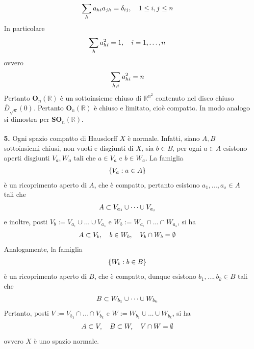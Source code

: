 \documentclass[oneside, 11pt]{amsbook}
\newcommand{\0}{{(0)}}
\newcommand{\3}{{(3)}}
\theoremstyle{colonplain}
\theoremstyle{colondefinition}
\theoremstyle{colonremark}
\numberwithin{equation}{chapter}
\begin{document}
\begin{align}
    \sum_h a_{hi}a_{jh} = \delta_{ij}, \quad 1 \leq i, j \leq n \notag
\end{align}
In particolare
\begin{align}
    \sum_h a^2_{hi} = 1, \quad i = 1, \dots, n \notag
\end{align}
ovvero
\begin{align}
    \sum_{h, i} a^2_{hi} = n \notag
\end{align}
Pertanto $\mathbf{O}_n(\mathbb{R})$ è un sottoinsieme chiuso di $\mathbb{R}^{n^2}$ contenuto nel disco chiuso $\overline{D}_{\sqrt{n}}(0)$. Pertanto $\mathbf{O}_n(\mathbb{R})$ è chiuso e limitato, cioè compatto. In modo analogo si dimostra per $\mathbf{SO}_n(\mathbb{R})$. \\ \\
\textbf{5.} Ogni spazio compatto di Hausdorff $X$ è normale. Infatti, siano $A, B$ sottoinsiemi chiusi, non vuoti e disgiunti di $X$, sia $b \in B$, per ogni $a \in A$ esistono aperti disgiunti $V_a, W_a$ tali che $a \in V_a$ e $b \in W_a$. La famiglia
\begin{align}
    \{ V_a : a \in A \} \notag
\end{align}
è un ricoprimento aperto di $A$, che è compatto, pertanto esistono $a_1, \dots, a_s \in A$ tali che
\begin{align}
    A \subset V_{a_1} \cup \dots \cup V_{a_s} \notag
\end{align}
e inoltre, posti $V_b := V_{a_1} \cup \dots \cup V_{a_s}$ e $W_b := W_{a_1} \cap \dots \cap W_{a_s}$, si ha
\begin{align}
    A \subset V_b, \quad b \in W_b, \quad V_b \cap W_b = \emptyset \notag
\end{align}
Analogamente, la famiglia
\begin{align}
    \{ W_b : b \in B \} \notag
\end{align}
è un ricoprimento aperto di $B$, che è compatto, dunque esistono $b_1, \dots, b_k \in B$ tali che
\begin{align}
    B \subset W_{b_1} \cup \dots \cup W_{b_k} \notag
\end{align}
Pertanto, posti $V := V_{b_1} \cap \dots \cap V_{b_k}$ e $W := W_{b_1} \cup \dots \cup W_{b_k}$, si ha
\begin{align}
    A \subset V, \quad B \subset W, \quad V \cap W = \emptyset \notag
\end{align}
ovvero $X$ è uno spazio normale.
\end{document}

